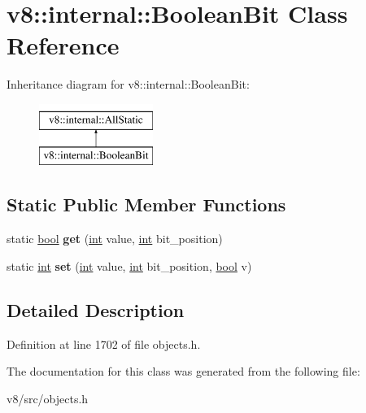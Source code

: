 \hypertarget{classv8_1_1internal_1_1BooleanBit}{}\section{v8\+:\+:internal\+:\+:Boolean\+Bit Class Reference}
\label{classv8_1_1internal_1_1BooleanBit}
Inheritance diagram for v8\+:\+:internal\+:\+:Boolean\+Bit\+:\begin{figure}[H]
\begin{center}
\leavevmode
\includegraphics[height=2.000000cm]{classv8_1_1internal_1_1BooleanBit}
\end{center}
\end{figure}
\subsection*{Static Public Member Functions}
\begin{DoxyCompactItemize}
\item 
\mbox{\label{classv8_1_1internal_1_1BooleanBit_a0021135995e316cd5abd7d024da90f3b}} 
static \mbox{\hyperlink{classbool}{bool}} {\bfseries get} (\mbox{\hyperlink{classint}{int}} value, \mbox{\hyperlink{classint}{int}} bit\+\_\+position)
\item 
\mbox{\label{classv8_1_1internal_1_1BooleanBit_afbfebc642ff88f009b5097ab8374dc64}} 
static \mbox{\hyperlink{classint}{int}} {\bfseries set} (\mbox{\hyperlink{classint}{int}} value, \mbox{\hyperlink{classint}{int}} bit\+\_\+position, \mbox{\hyperlink{classbool}{bool}} v)
\end{DoxyCompactItemize}


\subsection{Detailed Description}


Definition at line 1702 of file objects.\+h.



The documentation for this class was generated from the following file\+:\begin{DoxyCompactItemize}
\item 
v8/src/objects.\+h\end{DoxyCompactItemize}
